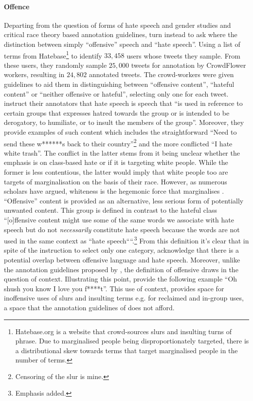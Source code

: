 \paragraph*{Offence} Departing from the question of forms of hate speech and gender studies and critical race theory based annotation guidelines, \citet{Davidson:2017} turn instead to ask where the distinction between simply ``offensive'' speech and ``hate speech''.
Using a list of terms from Hatebase\footnote{Hatebase.org is a website that crowd-sources slurs and insulting turns of phrase. Due to marginalised people being disproportionately targeted, there is a distributional skew towards terms that target marginalised people in the number of terms.} to identify $33,458$ users whose tweets they sample.
From these users, they randomly sample $25,000$ tweets for annotation by CrowdFlower workers, resulting in $24,802$ annotated tweets. The crowd-workers were given guidelines to aid them in distinguishing between ``offensive content'', ``hateful content'' or ``neither offensive or hateful'', selecting only one for each tweet. \citet{Davidson:2017} instruct their annotators that hate speech is speech that ``is used in reference to certain groups that expresses hatred towards the group or is intended to be derogatory, to humiliate, or to insult the members of the group''. Moreover, they provide examples of such content which includes the straightforward ``Need to send these w******s back to their country''\footnote{Censoring of the slur is mine.} and the more conflicted ``I hate white trash''. The conflict in the latter stems from it being unclear whether the emphasis is on class-based hate or if it is targeting white people. While the former is less contentious, the latter would imply that white people too are targets of marginalisation on the basis of their race. However, as numerous scholars have argued, whiteness is the hegemonic force that marginalises \citep{CRT scholars}.
``Offensive'' content is provided as an alternative, less serious form of potentially unwanted content. This group is defined in contrast to the hateful class ``[o]ffensive content might use some of the same words we associate with hate speech but do not \textit{necessarily} constitute hate speech because the words are not used in the same context as ``hate speech````.\footnote{Emphasis added.}
From this definition it's clear that in spite of the instruction to select only one category, \citet{Davidson:2017} acknowledge that there is a potential overlap between offensive language and hate speech. 
Moreover, unlike the annotation guidelines proposed by \citet{Waseem-Hovy:2016}, the definition of offensive draws in the question of context. Illustrating this point, \citet{Davidson:2017} provide the following example ``Oh shush you know I love you f****t''. This use of context, provides space for inoffensive uses of slurs and insulting terms e.g. for reclaimed and in-group uses, a space that the annotation guidelines of \citet{Waseem-Hovy:2016} does not afford.
